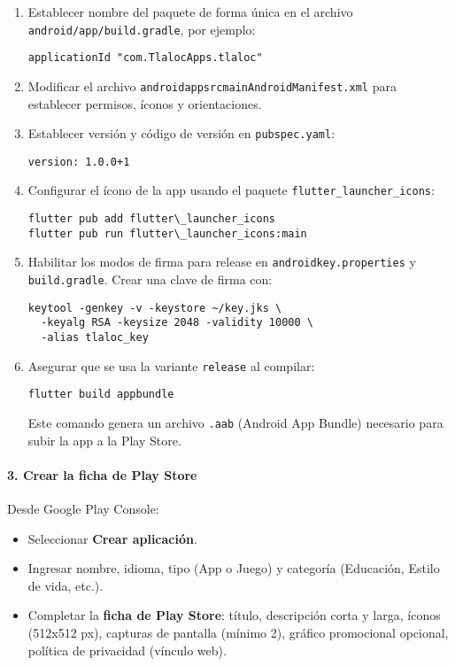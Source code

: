 \begin{enumerate}
    \item Establecer nombre del paquete de forma única en el archivo \texttt{android/app/build.gradle}, por ejemplo:
\begin{verbatim}
applicationId "com.TlalocApps.tlaloc"
\end{verbatim}

    \item Modificar el archivo \texttt{android\/app\/src\/main\/AndroidManifest.xml} para establecer permisos, íconos y orientaciones.

    \item Establecer versión y código de versión en \texttt{pubspec.yaml}:
\begin{verbatim}
version: 1.0.0+1
\end{verbatim}

    \item Configurar el ícono de la app usando el paquete \texttt{flutter\_launcher\_icons}:
\begin{verbatim}
flutter pub add flutter\_launcher_icons
flutter pub run flutter\_launcher_icons:main
\end{verbatim}

    \item Habilitar los modos de firma para release en \texttt{android\/key.properties} y \texttt{build.gradle}. Crear una clave de firma con:
\begin{verbatim}
keytool -genkey -v -keystore ~/key.jks \
  -keyalg RSA -keysize 2048 -validity 10000 \
  -alias tlaloc_key
\end{verbatim}

    \item Asegurar que se usa la variante \texttt{release} al compilar:
\begin{verbatim}
flutter build appbundle
\end{verbatim}

    Este comando genera un archivo \texttt{.aab} (Android App Bundle) necesario para subir la app a la Play Store.
\end{enumerate}

\paragraph{3. Crear la ficha de Play Store}

Desde Google Play Console:

\begin{itemize}
    \item Seleccionar \textbf{Crear aplicación}.
    \item Ingresar nombre, idioma, tipo (App o Juego) y categoría (Educación, Estilo de vida, etc.).
    \item Completar la \textbf{ficha de Play Store}: título, descripción corta y larga, íconos (512x512 px), capturas de pantalla (mínimo 2), gráfico promocional opcional, política de privacidad (vínculo web).
\end{itemize}

